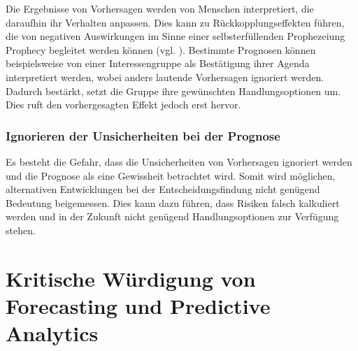 Die Ergebnisse von Vorhersagen werden von Menschen interpretiert,
die daraufhin ihr Verhalten anpassen. Dies kann zu Rückkopplungseffekten führen,
die von negativen Auswirkungen im Sinne einer selbsterfüllenden Prophezeiung
 Prophecy\grqq{} begleitet werden können
(vgl. \cite{Crossman}). Bestimmte Prognosen können beispielsweise von einer 
Interessengruppe als Bestätigung ihrer Agenda interpretiert werden, wobei
anders lautende Vorhersagen ignoriert werden. Dadurch bestärkt, setzt die Gruppe
ihre gewünschten Handlungsoptionen um. Dies ruft den vorhergesagten Effekt
jedoch erst hervor.

\subsubsection{Ignorieren der Unsicherheiten bei der Prognose}

Es besteht die Gefahr, dass die Unsicherheiten von Vorhersagen ignoriert werden
und die Prognose als eine Gewissheit betrachtet wird. Somit wird möglichen,
alternativen Entwicklungen bei der Entscheidungsfindung nicht genügend Bedeutung
beigemessen. Dies kann dazu führen, dass Risiken falsch kalkuliert werden und
in der Zukunft nicht genügend Handlungsoptionen zur Verfügung stehen.

\section{Kritische Würdigung von Forecasting und Predictive Analytics}
